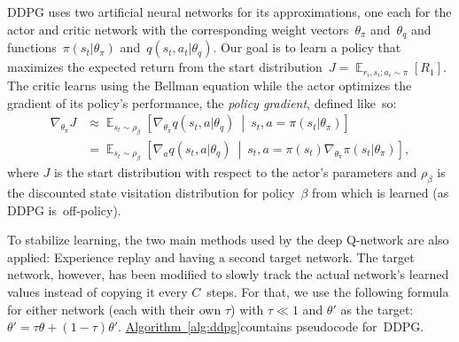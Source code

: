 \documentclass[a4paper,titlepage]{article}
\DeclareMathOperator{\Expectation}{\mathbb{E}}
\newcommand{\Exp}[3]{\Expectation_{#1} \left[ #2 \ \middle| \ #3 \right]}
\newcommand{\Ex}[2]{\Expectation_{#1} \left[ #2 \right]}
\begin{document}
DDPG uses two artificial neural networks for its approximations, one each for the actor and critic network with the corresponding weight vectors~$\theta_\pi$ and~$\theta_q$ and functions~$\pi(s_t | \theta_\pi)$ and~$q(s_t, a_t | \theta_q)$. Our goal is to learn a policy that maximizes the expected return from the start distribution~$J = \Ex{r_i, s_i; a_i \sim \pi}{R_1}$. The critic learns using the Bellman equation while the actor optimizes the gradient of its policy's performance, the \emph{policy gradient}, defined like~so:
\begin{align*}
  \nabla_{\theta_\pi} J &\approx \Exp{s_t \sim \rho_\beta}{\nabla_{\theta_\pi} q(s_t, a | \theta_q)}{s_t, a = \pi(s_t | \theta_\pi)} \\
  &= \Exp{s_t \sim \rho_\beta}{\nabla_a q(s_t, a | \theta_q)}{s_t, a = \pi(s_t) \nabla_{\theta_\pi} \pi(s_t | \theta_\pi)},
\end{align*}
where $J$ is the start distribution with respect to the actor's parameters and $\rho_\beta$ is the discounted state visitation distribution for policy~$\beta$ from which is learned (as DDPG is~off-policy).

To stabilize learning, the two main methods used by the deep Q-network are also applied: Experience replay and having a second target network. The target network, however, has been modified to slowly track the actual network's learned values instead of copying it every $C$~steps. For that, we use the following formula for either network (each with their own $\tau$) with $\tau \ll 1$ and $\theta'$ as the target: $\theta' = \tau \theta + (1 - \tau) \theta'$. \hyperref[alg:ddpg]{Algorithm~\ref*{alg:ddpg}}countains pseudocode for~DDPG.
\end{document}
